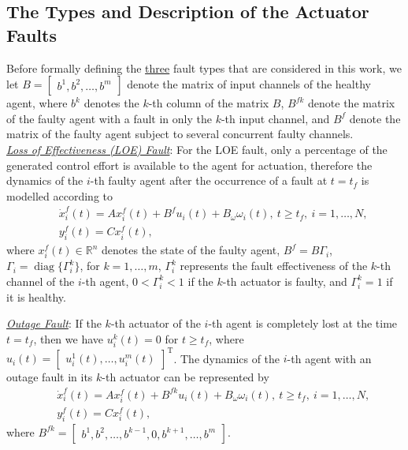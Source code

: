 \documentclass[12pt,draftcls,onecolumn]{IEEEtran}
\begin{document}
\subsection{The Types and Description of the Actuator  Faults} 
Before formally defining the \underline{three} fault types that are considered in this work, we let $B=\begin{bmatrix}b^1,b^2,\dots,b^{m}\end{bmatrix}$ denote the matrix of  input channels of the healthy agent, where $b^k$ denotes the $k$-th column of the matrix $B$, $B^{fk}$  denote the matrix of the  faulty agent with a fault in only the $k$-th input channel,  and $B^f$ denote the matrix of the  faulty agent subject to several concurrent faulty channels. \\
\underline{\emph{Loss of Effectiveness (LOE) Fault}}: 
For the LOE fault, only a percentage of the generated control effort is available to the agent for actuation, therefore the dynamics of the $i$-th faulty agent after the occurrence of a fault at $t=t_f$ is modelled according to 
\begin{eqnarray}
&&\dot x_i^f(t)=A x_i^f(t)+B^f u_i(t)+B_\omega \omega_i(t),\ t\geq t_f,\ i=1,\dots,N, \label{faulty system}\\
&&y_i^f(t)=Cx_i^f(t),\nonumber
\end{eqnarray}
where $x_i^f(t)\in\mathbb{R}^n$ denotes the state of the faulty agent, $B^f=B \Gamma_i$, $ \Gamma_i=\operatorname{diag} \{ \Gamma_i^k \}$, for $k=1,\dots,m$, $\Gamma_i^k$ represents the fault effectiveness  of the $k$-th channel of the $i$-th agent, $0<\Gamma_i^k<1$ if the $k$-th actuator is faulty, and $\Gamma_i^k=1$ if it is healthy. \par
\noindent \underline{\emph{Outage Fault}}: If the $k$-th actuator of the $i$-th agent is completely  lost at the time $t=t_f$, then we have $u_i^k(t)=0$ for $t\geq t_f$, where $u_i(t)=\begin{bmatrix}u_i^1(t),\dots,u_i^m(t)\end{bmatrix}^\text{T}$. The dynamics of the $i$-th agent with an outage fault in its $k$-th actuator can be represented by 
\begin{eqnarray}
&&\dot x_i^f(t)=A x_i^f(t)+B^{fk} u_i(t)+B_\omega \omega_i(t),\ t\geq t_f,\ i=1,\dots,N,\label{otage}\\
&&y_i^f(t)=Cx_i^f(t)\nonumber,
\end{eqnarray} 
where  $B^{fk}=\begin{bmatrix}b^1,b^2,\dots,b^{k-1},0,b^{k+1},\dots,b^{m}\end{bmatrix}$.\par
\end{document}
